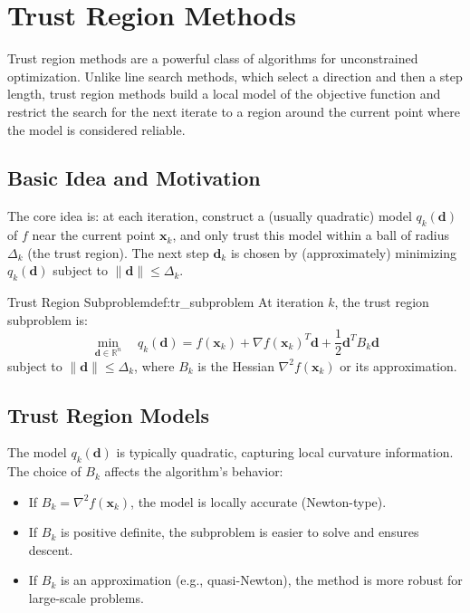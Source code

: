 \documentclass{MathNote}
\begin{document}
\section{Trust Region Methods}

Trust region methods are a powerful class of algorithms for unconstrained optimization. Unlike line search methods, which select a direction and then a step length, trust region methods build a local model of the objective function and restrict the search for the next iterate to a region around the current point where the model is considered reliable.

\subsection{Basic Idea and Motivation}

The core idea is: at each iteration, construct a (usually quadratic) model $q_k(\bm{d})$ of $f$ near the current point $\bm{x}_k$, and only trust this model within a ball of radius $\Delta_k$ (the trust region). The next step $\bm{d}_k$ is chosen by (approximately) minimizing $q_k(\bm{d})$ subject to $\|\bm{d}\| \le \Delta_k$.

\begin{definition}{Trust Region Subproblem}{def:tr_subproblem}
    At iteration $k$, the trust region subproblem is:
    $$
    \min_{\bm{d} \in \mathbb{R}^n} \quad q_k(\bm{d}) = f(\bm{x}_k) + \nabla f(\bm{x}_k)^T \bm{d} + \frac{1}{2} \bm{d}^T B_k \bm{d}
    $$
    subject to $\|\bm{d}\| \le \Delta_k$, where $B_k$ is the Hessian $\nabla^2 f(\bm{x}_k)$ or its approximation.
\end{definition}

\subsection{Trust Region Models}

The model $q_k(\bm{d})$ is typically quadratic, capturing local curvature information. The choice of $B_k$ affects the algorithm's behavior:
\begin{itemize}
    \item If $B_k = \nabla^2 f(\bm{x}_k)$, the model is locally accurate (Newton-type).
    \item If $B_k$ is positive definite, the subproblem is easier to solve and ensures descent.
    \item If $B_k$ is an approximation (e.g., quasi-Newton), the method is more robust for large-scale problems.
\end{itemize}
\end{document}
